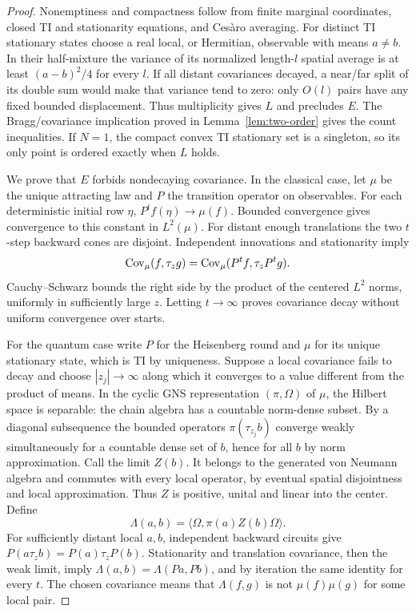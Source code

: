 \begin{proof}
Nonemptiness and compactness follow from finite marginal coordinates,
closed TI and stationarity equations, and Ces\`aro averaging.
For distinct TI stationary states choose a real local, or Hermitian,
observable with means $a\ne b$. In their half-mixture the variance
of its normalized length-$l$ spatial average is at least
$(a-b)^2/4$ for every $l$. If all distant covariances decayed, a
near/far split of its double sum would make that variance tend to
zero: only $O(l)$ pairs have any fixed bounded displacement.
Thus multiplicity gives $L$ and precludes $E$. The Bragg/covariance
implication proved in Lemma~\ref{lem:two-order} gives the count
inequalities. If $N=1$, the compact convex TI stationary set is a
singleton, so its only point is ordered exactly when $L$ holds.

We prove that $E$ forbids nondecaying covariance. In the classical
case, let $\mu$ be the unique attracting law and $P$ the transition
operator on observables. For each deterministic initial row $\eta$,
$P^tf(\eta)\to\mu(f)$. Bounded convergence gives convergence to this
constant in $L^2(\mu)$. For distant enough translations the two
$t$-step backward cones are disjoint. Independent innovations and
stationarity imply
\[
 \operatorname{Cov}_\mu(f,\tau_zg)
   =\operatorname{Cov}_\mu(P^tf,\tau_zP^tg).
\]
Cauchy--Schwarz bounds the right side by the product of the centered
$L^2$ norms, uniformly in sufficiently large $z$. Letting $t\to\infty$
proves covariance decay without uniform convergence over starts.

For the quantum case write $P$ for the Heisenberg round and $\mu$
for its unique stationary state, which is TI by uniqueness.
Suppose a local covariance fails to decay and choose $|z_j|\to\infty$
along which it converges to a value different from the product of
means. In the cyclic GNS representation $(\pi,\Omega)$ of $\mu$,
the Hilbert space is separable: the chain algebra has a countable
norm-dense subset. By a diagonal subsequence the bounded operators
$\pi(\tau_{z_j}b)$ converge weakly simultaneously for a countable
dense set of $b$, hence for all $b$ by norm approximation.
Call the limit $Z(b)$. It belongs to the generated von Neumann
algebra and commutes with every local operator, by eventual spatial
disjointness and local approximation. Thus $Z$ is positive, unital
and linear into the center. Define
\[
 \Lambda(a,b)=\langle\Omega,\pi(a)Z(b)\Omega\rangle.
\]
For sufficiently distant local $a,b$, independent backward circuits
give $P(a\tau_zb)=P(a)\tau_zP(b)$. Stationarity and translation
covariance, then the weak limit, imply
$\Lambda(a,b)=\Lambda(Pa,Pb)$, and by iteration the same identity
for every $t$. The chosen covariance means that $\Lambda(f,g)$
is not $\mu(f)\mu(g)$ for some local pair.


\end{proof}
